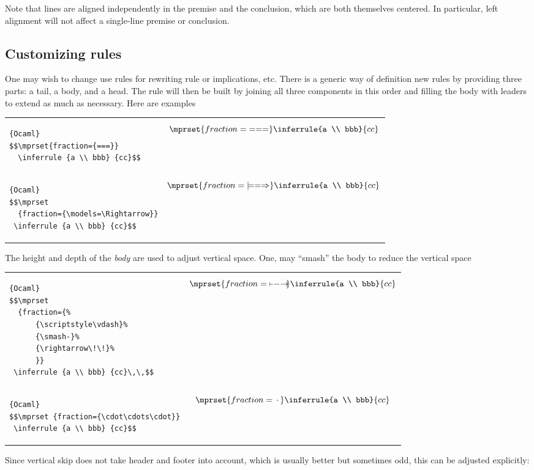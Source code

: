 \documentclass {article}
\begin{document}
\noindent
Note that lines are aligned independently in the premise and the
conclusion, which are both themselves centered. In particular,
left alignment will not affect a single-line premise or conclusion.

\subsection {Customizing rules}

One may wish to change use rules for rewriting rule or implications, etc.
There is a generic way of definition new rules by providing three parts:
a tail, a body, and a head. The rule will then be built by joining
all three components in this order and filling the body with leaders to
extend as much as necessary. Here are examples

\begin{tabular}{m{0.54\hsize}m{0.44\hsize}}
\begin{lstlisting}{Ocaml}
$$\mprset{fraction={===}}
  \inferrule {a \\ bbb} {cc}$$
\end{lstlisting}
&
$$\mprset{fraction={===}}
  \inferrule {a \\ bbb} {cc}$$

\\
\begin{lstlisting}{Ocaml}
$$\mprset
  {fraction={\models=\Rightarrow}}
 \inferrule {a \\ bbb} {cc}$$
\end{lstlisting}
&
$$\mprset
  {fraction={\models=\Rightarrow}}
  \inferrule {a \\ bbb} {cc}$$
\\
\end{tabular}
The height and depth of the \emph{body} are used to adjust vertical space.
One, may ``smash'' the body to reduce the vertical space

\begin{tabular}{m{0.54\hsize}m{0.44\hsize}}
\begin{lstlisting}{Ocaml}
$$\mprset
  {fraction={%
      {\scriptstyle\vdash}%
      {\smash-}%
      {\rightarrow\!\!}%
      }}
 \inferrule {a \\ bbb} {cc}\,\,$$
\end{lstlisting}
&
$$\mprset
  {fraction={{\scriptstyle\vdash}{\smash-}{\rightarrow\!\!}}}
  \inferrule {a \\ bbb} {cc}$$
\\
\begin{lstlisting}{Ocaml}
$$\mprset {fraction={\cdot\cdots\cdot}}
 \inferrule {a \\ bbb} {cc}$$
\end{lstlisting}
&
$$\mprset {fraction={{}{\,\smash\cdot\,}{}}}
  \inferrule {a \\ bbb} {cc}$$
\\
\end{tabular}
Since vertical skip does not take header and footer into account, which is
usually better but sometimes odd, this can be adjusted explicitly:
\end{document}
